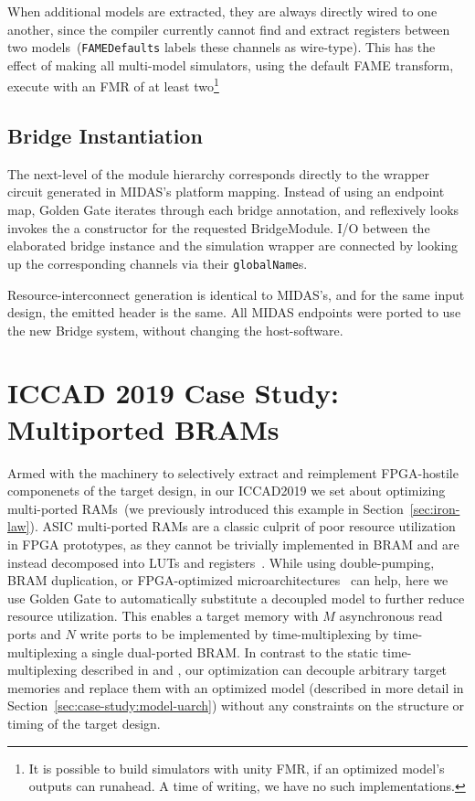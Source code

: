 When additional models are extracted, they are always directly wired to one
another, since the compiler currently cannot find and extract registers between
two models~(\texttt{FAMEDefaults} labels these channels as wire-type). This has
the effect of making all multi-model simulators, using the default FAME
transform, execute with an FMR of at least two\footnote{It is possible to build
simulators with unity FMR, if an optimized model's outputs can runahead. A time
of writing, we have no such implementations.}

\subsection{Bridge Instantiation}
The next-level of the module hierarchy corresponds directly to the wrapper
circuit generated in MIDAS's platform mapping. Instead of using an endpoint
map, Golden Gate iterates through each bridge annotation, and reflexively looks
invokes the a constructor for the requested BridgeModule. I/O between the elaborated
bridge instance and the simulation wrapper are connected by looking up the
corresponding channels via their \texttt{globalName}s.

Resource-interconnect generation is identical to MIDAS's, and for the same
input design, the emitted header is the same. All MIDAS endpoints were ported
to use the new Bridge system, without changing the host-software.

\section{ICCAD 2019 Case Study: Multiported BRAMs}

Armed with the machinery to selectively extract and reimplement FPGA-hostile
componenets of the target design, in our ICCAD2019 we set about optimizing
multi-ported RAMs~(we previously introduced this example in
Section~\ref{sec:iron-law}).  ASIC multi-ported RAMs are a classic culprit of
poor resource utilization in FPGA prototypes, as they cannot be trivially
implemented in BRAM and are instead decomposed into LUTs and
registers~\cite{FPGAGap2}.  While using double-pumping, BRAM duplication, or
FPGA-optimized microarchitectures~\cite{MultiportXOR} can help, here we use Golden Gate to
automatically substitute a decoupled model to further reduce resource
utilization. This enables a target memory with $M$ asynchronous read ports and
$N$ write ports to be implemented by time-multiplexing by time-multiplexing
a single dual-ported BRAM. In contrast to the static time-multiplexing described
in \cite{APortNetworks} and \cite{fabscalarfpga}, our optimization can decouple arbitrary target
memories and replace them with an optimized model (described in more detail in
Section~\ref{sec:case-study:model-uarch}) without any constraints on the structure or timing of the
target design.

